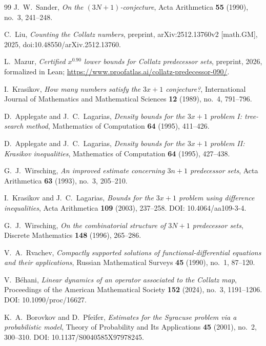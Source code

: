 \documentclass[11pt]{article}
\theoremstyle{definition}
\theoremstyle{remark}
\begin{document}
\begin{thebibliography}{99}
 J.\ W.\ Sander, \emph{On the $(3N+1)$-conjecture},
  Acta Arithmetica \textbf{55} (1990), no.\ 3, 241--248.

 C.\ Liu, \emph{Counting the Collatz numbers}, preprint,
  arXiv:2512.13760v2 [math.GM], 2025, doi:10.48550/arXiv.2512.13760.

 L.\ Mazur, \emph{Certified $x^{0.90}$ lower bounds
  for Collatz predecessor sets}, preprint, 2026, formalized in Lean;
  \url{https://www.proofatlas.ai/collatz-predecessor-090/}.

 I.\ Krasikov, \emph{How many numbers satisfy the
  $3x+1$ conjecture?}, International Journal of Mathematics and
  Mathematical Sciences \textbf{12} (1989), no.\ 4, 791--796.

 D.\ Applegate and J.\ C.\ Lagarias,
  \emph{Density bounds for the $3x+1$ problem I: tree-search method},
  Mathematics of Computation \textbf{64} (1995), 411--426.

 D.\ Applegate and J.\ C.\ Lagarias,
  \emph{Density bounds for the $3x+1$ problem II: Krasikov
  inequalities}, Mathematics of Computation \textbf{64} (1995),
  427--438.

 G.\ J.\ Wirsching, \emph{An improved estimate
  concerning $3n+1$ predecessor sets}, Acta Arithmetica \textbf{63}
  (1993), no.\ 3, 205--210.

 I.\ Krasikov and J.\ C.\ Lagarias,
  \emph{Bounds for the $3x+1$ problem using difference inequalities},
  Acta Arithmetica \textbf{109} (2003), 237--258.
  DOI: 10.4064/aa109-3-4.

 G.\ J.\ Wirsching, \emph{On the combinatorial
  structure of $3N+1$ predecessor sets}, Discrete Mathematics
  \textbf{148} (1996), 265--286.

 V.\ A.\ Rvachev, \emph{Compactly supported
  solutions of functional-differential equations and their
  applications}, Russian Mathematical Surveys \textbf{45} (1990),
  no.\ 1, 87--120.

 V.\ B\'ehani, \emph{Linear dynamics of an operator
  associated to the Collatz map}, Proceedings of the American
  Mathematical Society \textbf{152} (2024), no.\ 3, 1191--1206.
  DOI: 10.1090/proc/16627.

 K.\ A.\ Borovkov and D.\ Pfeifer,
  \emph{Estimates for the Syracuse problem via a probabilistic model},
  Theory of Probability and Its Applications \textbf{45} (2001),
  no.\ 2, 300--310. DOI: 10.1137/S0040585X97978245.


\end{thebibliography}
\end{document}
